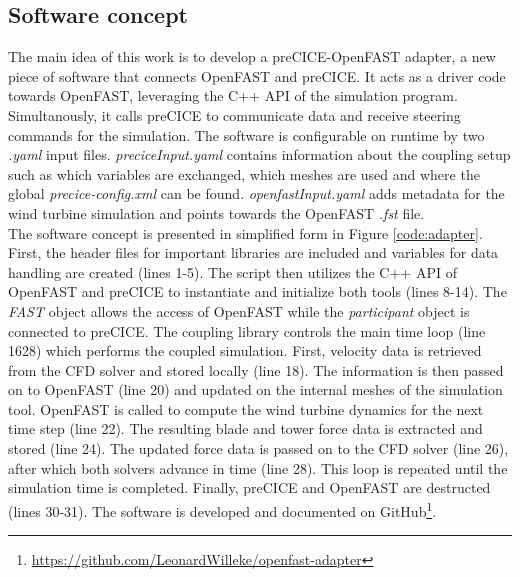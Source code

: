 
\subsection{Software concept}

The main idea of this work is to develop a preCICE-OpenFAST adapter, a new piece of software that connects OpenFAST and preCICE. It acts as a driver code towards OpenFAST, leveraging the C++ API of the simulation program. Simultanously, it calls preCICE to communicate data and receive steering commands for the simulation. The software is configurable on runtime by two \textit{.yaml} input files. \textit{preciceInput.yaml} contains information about the coupling setup such as which variables are exchanged, which meshes are used and where the global \textit{precice-config.xml} can be found. \textit{openfastInput.yaml} adds metadata for the wind turbine simulation and points towards the OpenFAST \textit{.fst} file.\\

The software concept is presented in simplified form in Figure \ref{code:adapter}. First, the header files for important libraries are included and variables for data handling are created (lines 1-5). The script then utilizes the C++ API of OpenFAST and preCICE to instantiate and initialize both tools (lines 8-14). The \textit{FAST} object allows the access of OpenFAST while the \textit{participant} object is connected to preCICE. The coupling library controls the main time loop (line 1628) which performs the coupled simulation. First, velocity data is retrieved from the CFD solver and stored locally (line 18). The information is then passed on to OpenFAST (line 20) and updated on the internal meshes of the simulation tool. OpenFAST is called to compute the wind turbine dynamics for the next time step (line 22). The resulting blade and tower force data is extracted and stored (line 24). The updated force data is passed on to the CFD solver (line 26), after which both solvers advance in time (line 28). This loop is repeated until the simulation time is completed. Finally, preCICE and OpenFAST are destructed (lines 30-31). The software is developed and documented on GitHub\footnote{\url{https://github.com/LeonardWilleke/openfast-adapter}}. 

